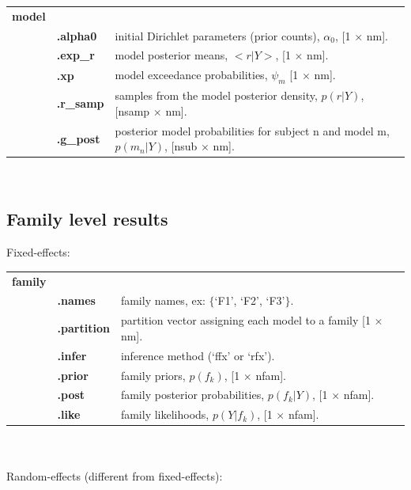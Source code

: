 \begin{tabular}{ l l l }
\bf{model}        & & \\
& \bf{.alpha0}  & initial Dirichlet parameters (prior counts), $\alpha_0$, [1 $\times$ nm].\\
& \bf{.exp\_r}   &  model posterior means, $<r|Y>$, [1 $\times$ nm].\\
& \bf{.xp}           & model exceedance probabilities, $\psi_m$ [1 $\times$ nm].\\
& \bf{.r\_samp} &  samples from the model posterior density, $p(r|Y)$, [nsamp $\times$ nm].\\
& \bf{.g\_post}  &  posterior model probabilities for subject n and model m, $p(m_n|Y)$, [nsub $\times$ nm].
\end{tabular}\\

\subsection{Family level results}

\hspace{4mm} Fixed-effects:\\

\begin{tabular}{ l l l }
\bf{family}         & & \\
& \bf{.names}   & family names, ex: $\{$`F1', `F2', `F3'$\}$.\\
& \bf{.partition} & partition vector assigning each model to a family [1 $\times$ nm].\\
& \bf{.infer	}       & inference method (`ffx' or `rfx').\\
& \bf{.prior}       & family priors, $p(f_k)$, [1 $\times$ nfam].\\
& \bf{.post}       & family posterior probabilities, $p(f_k|Y)$, [1 $\times$ nfam].\\
& \bf{.like}        & family likelihoods, $p(Y| f_k)$, [1 $\times$ nfam].
\end{tabular}\\\\

Random-effects (different from fixed-effects):\\

